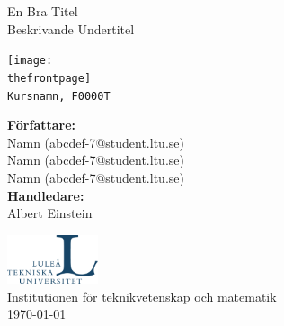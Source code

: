 \def\thetitle{En Bra Titel}
\def\theundertitle{Beskrivande Undertitel}

\def\thefrontpage{framsida.png}

\def\thecourse{Kursnamn, F0000T}

\def\theauthor{
Namn (abcdef-7@student.ltu.se) \\
Namn (abcdef-7@student.ltu.se) \\ 
Namn (abcdef-7@student.ltu.se)
}

\def\thesupervisor{Albert Einstein}

\def\theinstitution{Institutionen för teknikvetenskap och matematik}

\begin{titlepage}
	\centering
	
	{\Huge \textrm{\thetitle} \\}
	{\Large \textrm{\theundertitle} \\}
	\vspace{0.8cm}
	
	\texttt{[image: \\thefrontpage]}\\
	\texttt{\thecourse}\\
	\vspace{0.8cm}
	
	{\textbf{Författare:} \\}
	{\large \theauthor\\} %
	\vspace{0.8cm}
	\textbf{Handledare:}\\
	\large{\thesupervisor}  %
	\vfill
	
    \includegraphics[width=0.2\textwidth]{Images/ltu_swe.jpg} \\
    \vspace{0.2cm}
    \textrm{\theinstitution} \\ \vspace{0.05cm}
	{\large \textrm{\today}\\}
\end{titlepage}